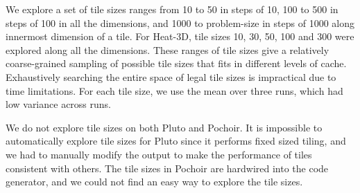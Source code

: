 We explore a set of tile sizes ranges from 10 to 50 in steps of 10, 100 to 500
in steps of 100 in all the dimensions, and 1000 to problem-size in steps of
1000 along innermost dimension of a tile. For Heat-3D, tile sizes 10, 30, 50,
100 and 300 were explored along all the dimensions. These ranges of tile sizes
give a relatively coarse-grained sampling of possible tile sizes that fits in
different levels of cache. Exhaustively searching the entire space of legal
tile sizes is impractical due to time limitations.  For each tile size, we use
the mean over three runs, which had low variance across runs.

We do not explore tile sizes on both Pluto and Pochoir. It is impossible to
automatically explore tile sizes for Pluto since it performs fixed sized
tiling, and we had to manually modify the output to make the performance of
tiles consistent with others. The tile sizes in Pochoir are hardwired into the
code generator, and we could not find an easy way to explore the tile sizes.



